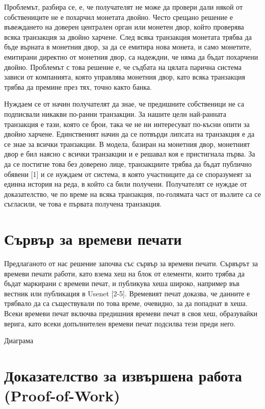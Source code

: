 \documentclass[11pt,a4paper]{article}
\begin{document}
Проблемът, разбира се, е, че получателят не може да провери дали някой от собствениците не е похарчил монетата двойно. Често срещано решение е въвеждането на доверен централен орган или монетен двор, който проверява всяка транзакция за двойно харчене. След всяка транзакция монетата трябва да бъде върната в монетния двор, за да се емитира нова монета, и само монетите, емитирани директно от монетния двор, са надеждни, че няма да бъдат похарчени двойно. Проблемът с това решение е, че съдбата на цялата парична система зависи от компанията, която управлява монетния двор, като всяка транзакция трябва да премине през тях, точно както банка.

Нуждаем се от начин получателят да знае, че предишните собственици не са подписвали никакви по-ранни транзакции. За нашите цели най-ранната транзакция е тази, която се брои, така че не ни интересуват по-късни опити за двойно харчене. Единственият начин да се потвърди липсата на транзакция е да се знае за всички транзакции. В модела, базиран на монетния двор, монетният двор е бил наясно с всички транзакции и е решавал коя е пристигнала първа. За да се постигне това без доверено лице, транзакциите трябва да бъдат публично обявени [1] и се нуждаем от система, в която участниците да се споразумеят за единна история на реда, в който са били получени. Получателят се нуждае от доказателство, че по време на всяка транзакция, по-голямата част от възлите са се съгласили, че това е първата получена транзакция.

\section{Сървър за времеви печати}
Предлаганото от нас решение започва със сървър за времеви печати. Сървърът за времеви печати работи, като взема хеш на блок от елементи, които трябва да бъдат маркирани с времеви печат, и публикува хеша широко, например във вестник или публикация в Usenet [2-5]. Времевият печат доказва, че данните е трябвало да са съществували по това време, очевидно, за да попаднат в хеша. Всеки времеви печат включва предишния времеви печат в своя хеш, образувайки верига, като всеки допълнителен времеви печат подсилва тези преди него.

Диаграма

\section{Доказателство за извършена работа (Proof-of-Work)}
\end{document}
